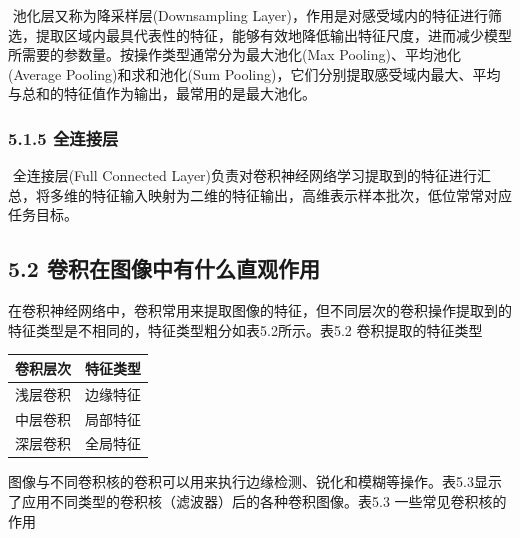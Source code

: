 ​ 池化层又称为降采样层(Downsampling
Layer)，作用是对感受域内的特征进行筛选，提取区域内最具代表性的特征，能够有效地降低输出特征尺度，进而减少模型所需要的参数量。按操作类型通常分为最大池化(Max
Pooling)、平均池化(Average Pooling)和求和池化(Sum
Pooling)，它们分别提取感受域内最大、平均与总和的特征值作为输出，最常用的是最大池化。

\subsubsection{5.1.5 全连接层}\label{ux5168ux8fdeux63a5ux5c42}

​ 全连接层(Full Connected
Layer)负责对卷积神经网络学习提取到的特征进行汇总，将多维的特征输入映射为二维的特征输出，高维表示样本批次，低位常常对应任务目标。

\subsection{5.2
卷积在图像中有什么直观作用}\label{ux5377ux79efux5728ux56feux50cfux4e2dux6709ux4ec0ux4e48ux76f4ux89c2ux4f5cux7528}

​
在卷积神经网络中，卷积常用来提取图像的特征，但不同层次的卷积操作提取到的特征类型是不相同的，特征类型粗分如表5.2所示。
​ 表5.2 卷积提取的特征类型

\begin{longtable}[]{@{}cc@{}}
\toprule
卷积层次 & 特征类型\tabularnewline
\midrule
\endhead
浅层卷积 & 边缘特征\tabularnewline
中层卷积 & 局部特征\tabularnewline
深层卷积 & 全局特征\tabularnewline
\bottomrule
\end{longtable}

图像与不同卷积核的卷积可以用来执行边缘检测、锐化和模糊等操作。表5.3显示了应用不同类型的卷积核（滤波器）后的各种卷积图像。
​ 表5.3 一些常见卷积核的作用

